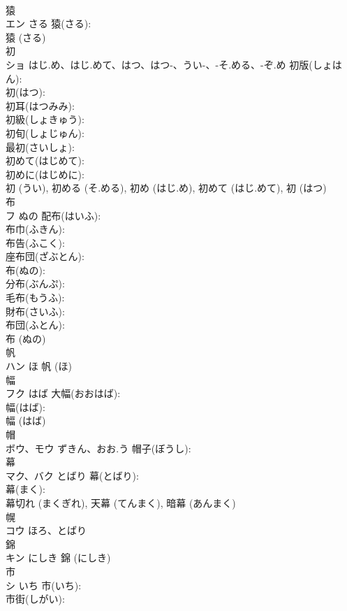 \documentclass[8pt]{extreport}
\begin{document}
\begin{CJK}{UTF8}{min}
\\	猿			
\\	エン	さる	猿(さる): 
\\	猿 (さる)
\\	初		
\\	ショ	はじ.め、はじ.めて、はつ、はつ-、うい-、-そ.める、-ぞ.め	初版(しょはん): 
\\	初(はつ): 
\\	初耳(はつみみ): 
\\	初級(しょきゅう): 
\\	初旬(しょじゅん): 
\\	最初(さいしょ): 
\\	初めて(はじめて): 
\\	初めに(はじめに): 
\\	初 (うい), 初める (そ.める), 初め (はじ.め), 初めて (はじ.めて), 初 (はつ)
\\	布		
\\	フ	ぬの	配布(はいふ): 
\\	布巾(ふきん): 
\\	布告(ふこく): 
\\	座布団(ざぶとん): 
\\	布(ぬの): 
\\	分布(ぶんぷ): 
\\	毛布(もうふ): 
\\	財布(さいふ): 
\\	布団(ふとん): 
\\	布 (ぬの)
\\	帆			
\\	ハン	ほ		帆 (ほ)
\\	幅			
\\	フク	はば	大幅(おおはば): 
\\	幅(はば): 
\\	幅 (はば)
\\	帽		
\\	ボウ、モウ	ずきん、おお.う	帽子(ぼうし): 
\\	幕			
\\	マク、バク	とばり	幕(とばり): 
\\	幕(まく): 
\\	幕切れ (まくぎれ), 天幕 (てんまく), 暗幕 (あんまく)
\\	幌			
\\	コウ	ほろ、とばり		
\\	錦			
\\	キン	にしき		錦 (にしき)
\\	市			
\\	シ	いち	市(いち): 
\\	市街(しがい): 

\end{CJK}
\end{document}
